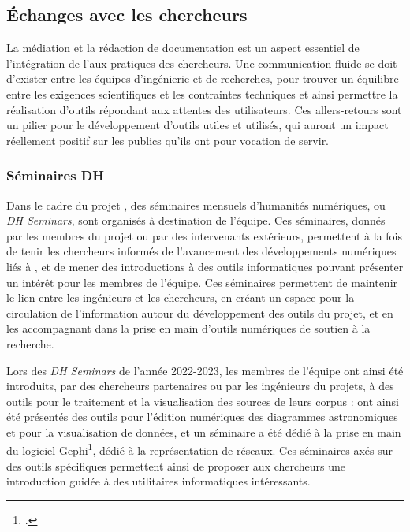 
\subsection{Échanges avec les chercheurs}
La médiation et la rédaction de documentation est un aspect essentiel de l'intégration de l'\ia aux pratiques des chercheurs. Une communication fluide se doit d'exister entre les équipes d'ingénierie et de recherches, pour trouver un équilibre entre les exigences scientifiques et les contraintes techniques et ainsi permettre la réalisation d'outils répondant aux attentes des utilisateurs. Ces allers-retours sont un pilier pour le développement d'outils utiles et utilisés, qui auront un impact réellement positif sur les publics qu'ils ont pour vocation de servir. 
	
    \subsubsection{Séminaires DH}
    Dans le cadre du projet \eida, des séminaires mensuels d'humanités numériques, ou \textit{DH Seminars}, sont organisés à destination de l'équipe. Ces séminaires, donnés par les membres du projet ou par des intervenants extérieurs, permettent à la fois de tenir les chercheurs informés de l'avancement des développements numériques liés à \eida, et de mener des introductions à des outils informatiques pouvant présenter un intérêt pour les membres de l'équipe. Ces séminaires permettent de maintenir le lien entre les ingénieurs et les chercheurs, en créant un espace pour la circulation de l'information autour du développement des outils du projet, et en les accompagnant dans la prise en main d'outils numériques de soutien à la recherche.
    
    Lors des \textit{DH Seminars} de l'année 2022-2023, les membres de l'équipe \eida ont ainsi été introduits, par des chercheurs partenaires ou par les ingénieurs du projets, à des outils pour le traitement et la visualisation des sources de leurs corpus : ont ainsi été présentés des outils pour l'édition numériques des diagrammes astronomiques et pour la visualisation de données, et un séminaire a été dédié à la prise en main du logiciel Gephi\footcite{Gephi}, dédié à la représentation de réseaux. Ces séminaires axés sur des outils spécifiques permettent ainsi de proposer aux chercheurs une introduction guidée à des utilitaires informatiques intéressants.
    
